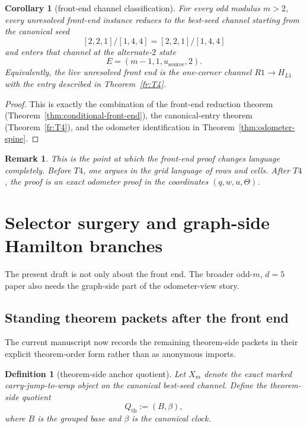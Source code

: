 \documentclass[11pt]{article}
\newtheorem{corollary}[theorem]{Corollary}
\newtheorem{remark}[theorem]{Remark}
\newtheorem{definition}[theorem]{Definition}
\newcommand{\CanL}{[2,2,1]}
\newcommand{\CanR}{[1,4,4]}
\newcommand{\CanSeed}{\CanL/\CanR}
\begin{document}
\begin{corollary}[front-end channel classification]
\label{cor:channel-classification}
For every odd modulus $m>2$, every unresolved front-end instance reduces to the
best-seed channel starting from the canonical seed
\[
\CanSeed=[2,2,1]/[1,4,4]
\]
and enters that channel at the alternate-$2$ state
\[
E=(m-1,1,u_{\mathrm{source}},2).
\]
Equivalently, the live unresolved front end is the one-corner channel
$R1\to H_{L1}$ with the entry described in Theorem~\ref{fr:T4}.
\end{corollary}

\begin{proof}
This is exactly the combination of the front-end reduction theorem
(Theorem~\ref{thm:conditional-front-end}), the canonical-entry theorem
(Theorem~\ref{fr:T4}), and the odometer identification in
Theorem~\ref{thm:odometer-spine}.
\end{proof}

\begin{remark}
This is the point at which the front-end proof changes language completely.
Before \(T4\), one argues in the grid language of rows and cells.
After \(T4\), the proof is an exact odometer proof in the coordinates
\((q,w,u,\Theta)\).
\end{remark}

\section{Selector surgery and graph-side Hamilton branches}
\label{sec:selector-surgery}

The present draft is not only about the front end.
The broader odd-$m$, $d=5$ paper also needs the graph-side part of the
odometer-view story.

\subsection{Standing theorem packets after the front end}

The current manuscript now records the remaining theorem-side packets in their
explicit theorem-order form rather than as anonymous imports.

\begin{definition}[theorem-side anchor quotient]
Let \(X_m\) denote the exact marked carry-jump-to-wrap object on the canonical
best-seed channel.
Define the theorem-side quotient
\[
Q_{\mathrm{th}}:=(B,\beta),
\]
where \(B\) is the grouped base and \(\beta\) is the canonical clock.
\end{definition}
\end{document}
